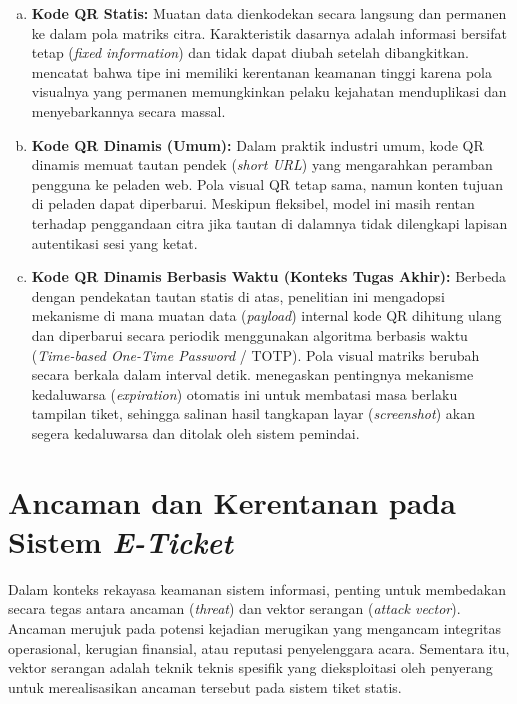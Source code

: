 \begin{enumerate}[a)]
    \item \textbf{Kode QR Statis:} Muatan data dienkodekan secara langsung dan permanen ke dalam pola matriks citra. Karakteristik dasarnya adalah informasi bersifat tetap (\textit{fixed information}) dan tidak dapat diubah setelah dibangkitkan. \textcite{yanuarafi2023perbandingan} mencatat bahwa tipe ini memiliki kerentanan keamanan tinggi karena pola visualnya yang permanen memungkinkan pelaku kejahatan menduplikasi dan menyebarkannya secara massal.
    
    \item \textbf{Kode QR Dinamis (Umum):} Dalam praktik industri umum, kode QR dinamis memuat tautan pendek (\textit{short URL}) yang mengarahkan peramban pengguna ke peladen web. Pola visual QR tetap sama, namun konten tujuan di peladen dapat diperbarui. Meskipun fleksibel, model ini masih rentan terhadap penggandaan citra jika tautan di dalamnya tidak dilengkapi lapisan autentikasi sesi yang ketat.

    \item \textbf{Kode QR Dinamis Berbasis Waktu (Konteks Tugas Akhir):} Berbeda dengan pendekatan tautan statis di atas, penelitian ini mengadopsi mekanisme di mana muatan data (\textit{payload}) internal kode QR dihitung ulang dan diperbarui secara periodik menggunakan algoritma berbasis waktu (\textit{Time-based One-Time Password} / TOTP). Pola visual matriks berubah secara berkala dalam interval detik. \textcite{sung2015security} menegaskan pentingnya mekanisme kedaluwarsa (\textit{expiration}) otomatis ini untuk membatasi masa berlaku tampilan tiket, sehingga salinan hasil tangkapan layar (\textit{screenshot}) akan segera kedaluwarsa dan ditolak oleh sistem pemindai.
\end{enumerate}

\section{Ancaman dan Kerentanan pada Sistem \textit{E-Ticket}}
\label{sec:keamanan_eticket}

Dalam konteks rekayasa keamanan sistem informasi, penting untuk membedakan secara tegas antara ancaman (\textit{threat}) dan vektor serangan (\textit{attack vector}). Ancaman merujuk pada potensi kejadian merugikan yang mengancam integritas operasional, kerugian finansial, atau reputasi penyelenggara acara. Sementara itu, vektor serangan adalah teknik teknis spesifik yang dieksploitasi oleh penyerang untuk merealisasikan ancaman tersebut pada sistem tiket statis.

